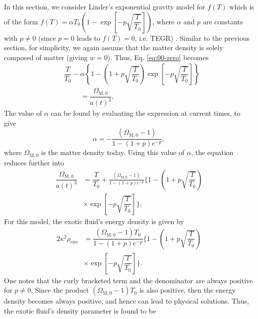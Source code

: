\documentclass[prl,floatfix,showpacs,twocolumn,preprintnumbers,amsmath,amssymb,superscriptaddress]{revtex4}
\begin{document}
In this section, we consider Linder's exponential gravity model for $f(T)$ which is of the form $f(T) = \alpha T_0 \left(1 - \exp \left[-p \sqrt{\dfrac{T}{T_0}}\right]\right)$, where $\alpha$ and $p$ are constants with $p \neq 0$ (since $p = 0$ leads to $f(T) = 0$, i.e. TEGR) \cite{Linder:2010py}. Similar to the previous section, for simplicity, we again assume that the matter density is solely composed of matter (giving $w = 0$). Thus, Eq. \eqref{eq:00-zero} becomes
\begin{align}
&\dfrac{T}{T_0}-\alpha \left\lbrace 1-\left(1+p\sqrt{\dfrac{T}{T_0}}\right)\exp \left[-p \sqrt{\dfrac{T}{T_0}}\right]\right\rbrace \nonumber \\
&\hspace{1cm} = \dfrac{\Omega_{\text{M},0}}{a(t)^3},
\end{align}
The value of $\alpha$ can be found by evaluating the expression at current times, to give
\begin{equation}
\alpha = -\frac{\left(\Omega_{\text{M},0}-1\right)}{1-\left(1+p\right)e^{-p}},
\end{equation}
where $\Omega_{\text{M},0}$ is the matter density today. Using this value of $\alpha$, the equation reduces further into
\begin{align}
\dfrac{\Omega_{\text{M},0}}{a(t)^3} &= \dfrac{T}{T_0}+\frac{\left(\Omega_{\text{M},0}-1\right)}{1-\left(1+p\right)e^{-p}} \bigg\lbrace 1-\left(1+p\sqrt{\dfrac{T}{T_0}}\right) \nonumber \\
&\times \exp \left[-p \sqrt{\dfrac{T}{T_0}}\right]\bigg\rbrace,
\end{align}
For this model, the exotic fluid's energy density is given by
\begin{align}
2\kappa^2 \rho_{\text{exo}} &= \dfrac{\left(\Omega_{\text{M},0}-1\right) T_0}{1-\left(1+p\right)e^{-p}}\bigg\lbrace 1-\left(1+p\sqrt{\dfrac{T}{T_0}}\right) \nonumber \\
&\times \exp \left[-p \sqrt{\dfrac{T}{T_0}}\right]\bigg\rbrace.
\end{align}
One notes that the curly bracketed term and the denominator are always positive for $p \neq 0$. Since the product $\left(\Omega_{\text{M},0}-1\right) T_0$ is also positive, then the energy density becomes always positive, and hence can lead to physical solutions. Thus, the exotic fluid's density parameter is found to be
\end{document}
